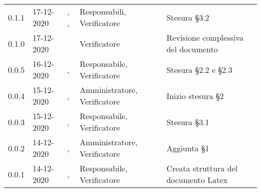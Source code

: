 {{\begin{longtable}{C{1.7cm} C{2.5cm} C{3.2cm} C{2.7cm} C{4.8cm}}
0.1.1 & 17-12-2020 & \SG{}, \BM{}, \SH{} & Responsabili, Verificatore & Stesura \S 3.2 \\

0.1.0 & 17-12-2020 & \ZM{} & Verificatore & Revisione complessiva del documento \\

0.0.5 & 16-12-2020 & \BM{}, \SH{} & Responsabile, Verificatore & Stesura \S 2.2 e \S 2.3 \\
		
0.0.4 & 15-12-2020 & \PA{}, \SH{} & Amministratore, Verificatore & Inizio stesura \S 2 \\

0.0.3 & 15-12-2020 & \SG{}, \ZM{} & Responsabile, Verificatore & Stesura \S 3.1 \\

0.0.2 & 14-12-2020 & \PA{}, \ZM{} & Amministratore, Verificatore & Aggiunta \S 1 \\

0.0.1 & 14-12-2020 & \SG{}, \ZM{} & Responsabile, Verificatore & Creata struttura del documento Latex \\
		
\end{longtable}
}
}
